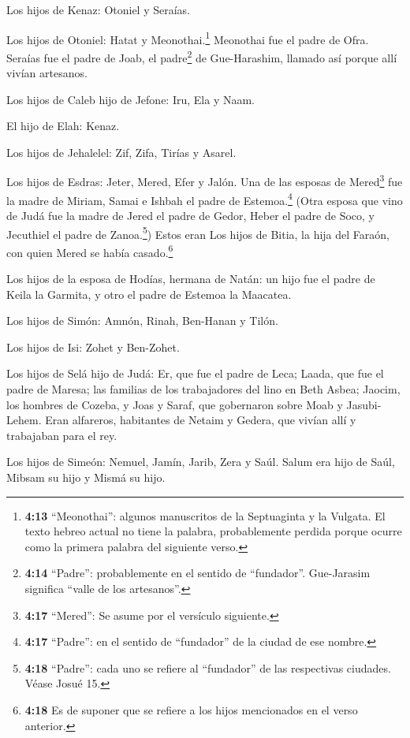  Los hijos de Kenaz: Otoniel y Seraías.

Los hijos de Otoniel: Hatat y Meonothai.\footnote{\textbf{4:13}
  ``Meonothai'': algunos manuscritos de la Septuaginta y la Vulgata. El
  texto hebreo actual no tiene la palabra, probablemente perdida porque
  ocurre como la primera palabra del siguiente verso.} 
Meonothai fue el padre de Ofra. Seraías fue el padre de Joab, el
padre\footnote{\textbf{4:14} ``Padre'': probablemente en el sentido de
  ``fundador''. Gue-Jarasim significa ``valle de los artesanos''.} de
Gue-Harashim, llamado así porque allí vivían artesanos.

 Los hijos de Caleb hijo de Jefone: Iru, Ela y Naam.

El hijo de Elah: Kenaz.

 Los hijos de Jehalelel: Zif, Zifa, Tirías y Asarel.

 Los hijos de Esdras: Jeter, Mered, Efer y Jalón. Una de
las esposas de Mered\footnote{\textbf{4:17} ``Mered'': Se asume por el
  versículo siguiente.} fue la madre de Miriam, Samai e Ishbah el padre
de Estemoa.\footnote{\textbf{4:17} ``Padre'': en el sentido de
  ``fundador'' de la ciudad de ese nombre.}  (Otra esposa
que vino de Judá fue la madre de Jered el padre de Gedor, Heber el padre
de Soco, y Jecuthiel el padre de Zanoa.\footnote{\textbf{4:18}
  ``Padre'': cada uno se refiere al ``fundador'' de las respectivas
  ciudades. Véase Josué 15.}) Estos eran Los hijos de Bitia, la hija del
Faraón, con quien Mered se había casado.\footnote{\textbf{4:18} Es de
  suponer que se refiere a los hijos mencionados en el verso anterior.}

 Los hijos de la esposa de Hodías, hermana de Natán: un
hijo fue el padre de Keila la Garmita, y otro el padre de Estemoa la
Maacatea.

 Los hijos de Simón: Amnón, Rinah, Ben-Hanan y Tilón.

Los hijos de Isi: Zohet y Ben-Zohet.

 Los hijos de Selá hijo de Judá: Er, que fue el padre de
Leca; Laada, que fue el padre de Maresa; las familias de los
trabajadores del lino en Beth Asbea;  Jaocim, los hombres
de Cozeba, y Joas y Saraf, que gobernaron sobre Moab y Jasubi-Lehem.
 Eran alfareros, habitantes de Netaim y Gedera, que vivían
allí y trabajaban para el rey.

 Los hijos de Simeón: Nemuel, Jamín, Jarib, Zera y Saúl.
 Salum era hijo de Saúl, Mibsam su hijo y Mismá su hijo.

